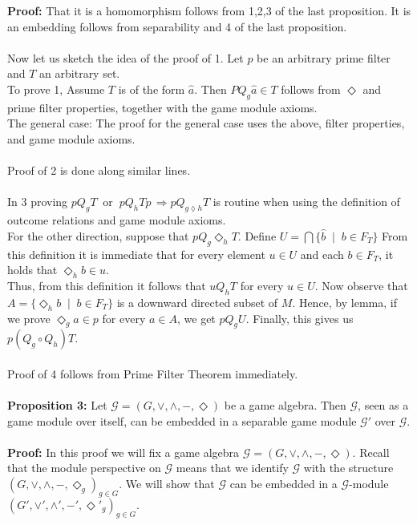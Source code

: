 \documentclass[12pt]{article}
\begin{document}
\textbf{Proof:} That it is a homomorphism follows from 1,2,3 of the last proposition. It is an embedding follows from separability and 4 of the last proposition. \\ \\
Now let us sketch the idea of the proof of 1. 
Let $p$ be an arbitrary prime filter and $T$ an arbitrary set.\\
To prove 1, Assume $T$ is of the form $\hat{a}$.  
Then $P Q_g \hat{a} \in T$ follows from $\Diamond$ and prime filter properties,  
together with the game module axioms. \\
The general case: The proof for the general case uses the above, filter properties, and game module axioms.\\ \\
Proof of 2 is done along similar lines. \\ \\
In 3 proving  $p Q_g T \;\; \text{or} \;\; p Q_h T p \, \Longrightarrow 
p Q_{g \lozenge h} T$ is routine when using the definition of outcome relations and game module axioms.\\
For the other direction, suppose that $p Q_g \Diamond_h T$.  
Define $U=\bigcap \{ \hat{b} \;\mid\; b \in F_T \}$
From this definition it is immediate that for every element $u \in U$ and each $b \in F_T$, it holds that $\Diamond_h b \in u$. \\
Thus, from this definition it follows that $u Q_h T$ for every $u \in U$. Now observe that $A=\{ \Diamond_h b \;\mid\; b \in F_T \}$ is a downward directed subset of $M$. Hence, by lemma, if we prove
$\Diamond_g a \in p$ for every $a \in A$, we get $p Q_g U$. Finally, this gives us $p (Q_g \circ Q_h) T$.\\ \\
Proof of 4 follows from Prime Filter Theorem immediately. \\ \\
\textbf{Proposition 3:} Let $\mathcal{G} = (G, \vee, \wedge, -, \Diamond)$ be a game algebra. 
Then $\mathcal{G}$, seen as a game module over itself, can be embedded in a separable game module $\mathcal{G}'$ over $\mathcal{G}$. \\ \\
\textbf{Proof:} 
In this proof we will fix a game algebra $\mathcal{G} = (G, \vee, \wedge, -, \Diamond)$. 
Recall that the module perspective on $\mathcal{G}$ means that we identify $\mathcal{G}$ with the structure $(G, \vee, \wedge, -, \Diamond_g)_{g \in G}$.
 We will show that $\mathcal{G}$ can be embedded in a $\mathcal{G}$-module $(G', \vee', \wedge', -', \Diamond'_g)_{g \in G}.$
\end{document}
